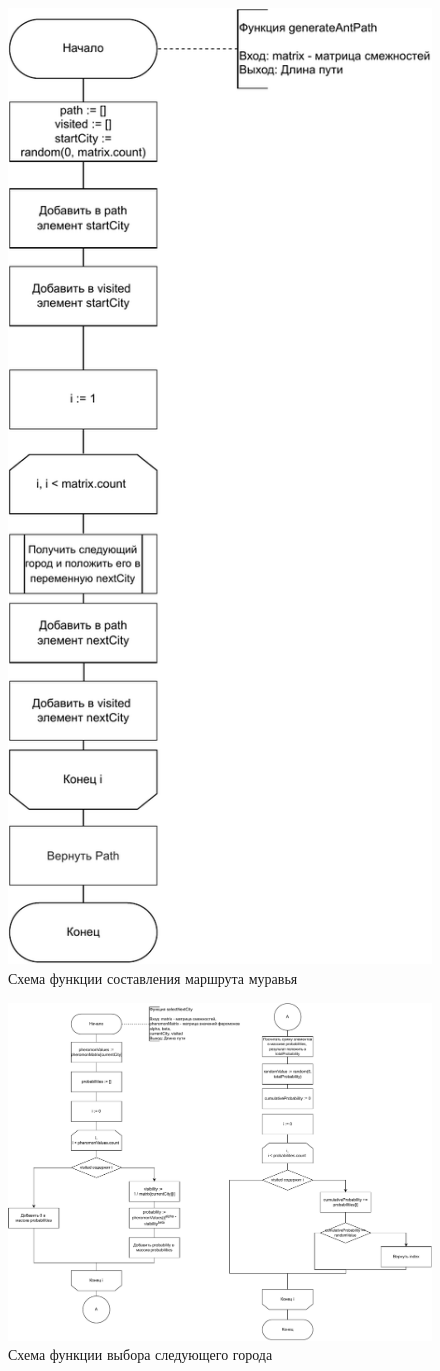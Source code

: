 \begin{figure}[h]
	\centering
	\includegraphics[width=0.6\linewidth]{img/ant2.pdf}
	\caption{Схема функции составления маршрута муравья}
	\label{img:ant2}
\end{figure}

\begin{figure}[h]
	\centering
	\includegraphics[width=1\linewidth]{img/ant3.pdf}
	\caption{Схема функции выбора следующего города}
	\label{img:ant3}
\end{figure}

